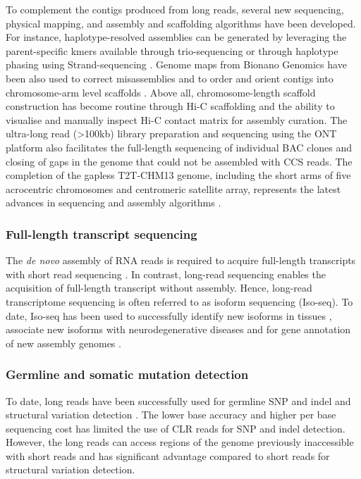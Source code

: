 To complement the contigs produced from long reads, several new sequencing, physical mapping, and assembly and scaffolding algorithms have been developed. For instance, haplotype-resolved assemblies can be generated by leveraging the parent-specific kmers available through trio-sequencing \cite{Koren2018-wg} or through haplotype phasing using Strand-sequencing \cite{Porubsky2021-ct}.  Genome maps from Bionano Genomics have been also used to correct misassemblies and to order and orient contigs into chromosome-arm level scaffolds \cite{Pendleton2015-ue}. Above all, chromosome-length scaffold construction has become routine through Hi-C scaffolding and the ability to visualise \cite{Robinson2018-os} and manually inspect Hi-C contact matrix for assembly curation\cite{Dudchenko2018-yl}. The ultra-long read (>100kb) library preparation and sequencing using the ONT platform \cite{Jain2018-zh} also facilitates the full-length sequencing of individual BAC clones \cite{Jain2018-mg} and closing of gaps in the genome that could not be assembled with CCS reads. The completion of the gapless T2T-CHM13 genome, including the short arms of five acrocentric chromosomes and centromeric satellite array, represents the latest advances in sequencing and assembly algorithms \cite{Nurk2022-dv}. 

\subsubsection{Full-length transcript sequencing}

The \textit{de novo} assembly of RNA reads is required to acquire full-length transcripts with short read sequencing \cite{Grabherr2011-yi}. In contrast, long-read sequencing enables the acquisition of full-length transcript without assembly. Hence, long-read transcriptome sequencing is often referred to as isoform sequencing (Iso-seq). To date, Iso-seq has been used to successfully identify new isoforms in tissues \cite{Tian2021-tn}, associate new isoforms with neurodegenerative diseases \cite{Zhu2021-up} and for gene annotation of new assembly genomes \cite{Mao2021-pj}.

\subsubsection{Germline and somatic mutation detection}

To date, long reads have been successfully used for germline SNP and indel \cite{Poplin2018-ub} and structural variation detection \cite{Chaisson2015-zz}. The lower base accuracy and higher per base sequencing cost has limited the use of CLR reads for SNP and indel detection. However, the long reads can access regions of the genome previously inaccessible with short reads and has significant advantage compared to short reads for structural variation detection. 

